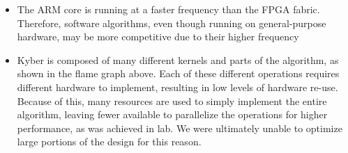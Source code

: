 \begin{itemize}
  \item The ARM core is running at a faster frequency than the FPGA
        fabric. Therefore, software algorithms, even though running on
        general-purpose hardware, may be more competitive due to their
        higher frequency
  \item Kyber is composed of many different kernels and parts of the
        algorithm, as shown in the flame graph above. Each of these
        different operations requires different hardware to implement,
        resulting in low levels of hardware re-use. Because of this,
        many resources are used to simply implement the entire algorithm,
        leaving fewer available to parallelize the operations for higher
        performance, as was achieved in lab. We were ultimately unable to
        optimize large portions of the design for this reason.
\end{itemize}

